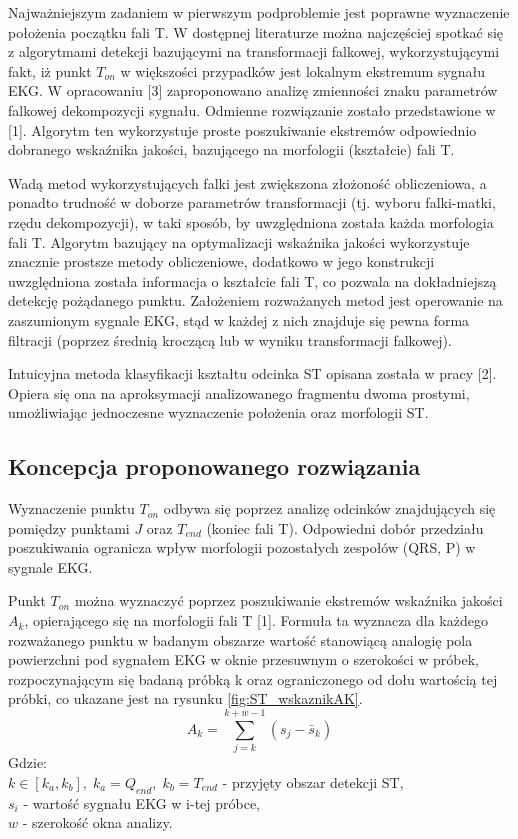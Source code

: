 Najważniejszym zadaniem w pierwszym podproblemie jest poprawne wyznaczenie położenia początku fali T. W dostępnej literaturze można najczęściej spotkać się z algorytmami detekcji bazującymi na transformacji falkowej, wykorzystującymi fakt, iż punkt $ T_{on} $ w większości przypadków jest lokalnym ekstremum sygnału EKG. W opracowaniu [3] zaproponowano analizę zmienności znaku parametrów falkowej dekompozycji sygnału. Odmienne rozwiązanie zostało przedstawione w [1]. Algorytm ten wykorzystuje proste poszukiwanie ekstremów odpowiednio dobranego wskaźnika jakości, bazującego na morfologii (kształcie) fali T.

Wadą metod wykorzystujących falki jest zwiększona złożoność obliczeniowa, a ponadto trudność w doborze parametrów transformacji (tj. wyboru falki-matki, rzędu dekompozycji), w taki sposób, by uwzględniona została każda morfologia fali T. Algorytm bazujący na optymalizacji wskaźnika jakości wykorzystuje znacznie prostsze metody obliczeniowe, dodatkowo w jego konstrukcji uwzględniona została informacja o kształcie fali T, co pozwala na dokładniejszą detekcję pożądanego punktu. Założeniem rozważanych metod jest operowanie na zaszumionym sygnale EKG, stąd w każdej z nich znajduje się pewna forma filtracji (poprzez średnią kroczącą lub w wyniku transformacji falkowej).

Intuicyjna metoda klasyfikacji kształtu odcinka ST opisana została w pracy [2]. Opiera się ona na aproksymacji analizowanego fragmentu dwoma prostymi, umożliwiając jednoczesne wyznaczenie położenia oraz morfologii ST.

\subsection{Koncepcja proponowanego rozwiązania}
Wyznaczenie punktu $ T_{on} $ odbywa się poprzez analizę odcinków znajdujących się pomiędzy punktami $ J $ oraz $ T_{end} $ (koniec fali T). Odpowiedni dobór przedziału poszukiwania ogranicza wpływ morfologii pozostałych zespołów (QRS, P) w sygnale EKG.

Punkt $ T_{on} $ można wyznaczyć poprzez poszukiwanie ekstremów wskaźnika jakości $ A_k $, opierającego się na morfologii fali T [1]. Formuła ta wyznacza dla każdego rozważanego punktu w badanym obszarze wartość stanowiącą analogię pola powierzchni pod sygnałem EKG w oknie przesuwnym o szerokości w próbek, rozpoczynającym się badaną próbką k oraz ograniczonego od dołu wartością tej próbki, co ukazane jest na rysunku \ref{fig:ST_wskaznikAK}.
\begin{equation}
	A_k = \sum_{j=k}^{k+w-1} \left( s_j-\bar{s}_k \right)
\end{equation}
Gdzie:\\
$ k \in \left[ k_a, k_b \right], \; k_a=Q_{end}, \; k_b=T_{end} $ - przyjęty obszar detekcji ST,\\
$ s_i $ - wartość sygnału EKG w i-tej próbce,\\
$ w $ - szerokość okna analizy.\\

